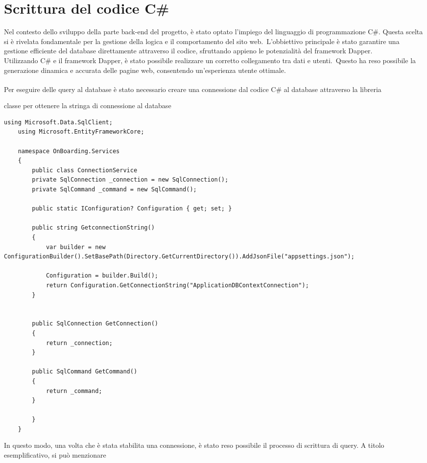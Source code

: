 \section{Scrittura del codice C\#}\label{sec:cap_sec_subsec}
Nel contesto dello sviluppo della parte back-end del progetto, è stato optato
l'impiego del linguaggio di programmazione C\#. Questa scelta si è rivelata
fondamentale per la gestione della logica e il comportamento del sito web.\
L'obbiettivo principale è stato garantire una gestione efficiente del database
direttamente attraverso il codice, sfruttando appieno le potenzialità del
framework Dapper. \\ Utilizzando C\# e il framework Dapper, è stato possibile
realizzare un corretto collegamento tra dati e utenti.\ Questo ha reso
possibile la generazione dinamica e accurata delle pagine web, consentendo
un'esperienza utente ottimale. \\ \\ Per eseguire delle query al database è
stato necessario creare una connessione dal codice C\# al database attraverso
la libreria \inlinecode{Microsoft.Data.SqlClient;}
%
\begin{algorithm}[H]
	\caption{classe per ottenere la stringa di connessione al database}
	\label{lst:genic_mpi}
	\begin{lstlisting}[label=lst:test]
	using Microsoft.Data.SqlClient;
	using Microsoft.EntityFrameworkCore;

	namespace OnBoarding.Services
	{
		public class ConnectionService
		private SqlConnection _connection = new SqlConnection();
		private SqlCommand _command = new SqlCommand();

		public static IConfiguration? Configuration { get; set; }

		public string GetconnectionString()
		{
			var builder = new ConfigurationBuilder().SetBasePath(Directory.GetCurrentDirectory()).AddJsonFile("appsettings.json");

			Configuration = builder.Build();
			return Configuration.GetConnectionString("ApplicationDBContextConnection");
		}


		public SqlConnection GetConnection() 
		{
			return _connection;
		}

		public SqlCommand GetCommand()
		{
			return _command;
		}

		}
	}
	\end{lstlisting}
\end{algorithm}
%
In questo modo, una volta che è stata stabilita una connessione, 
è stato reso possibile il processo di scrittura di query. A titolo esemplificativo, si può menzionare 
